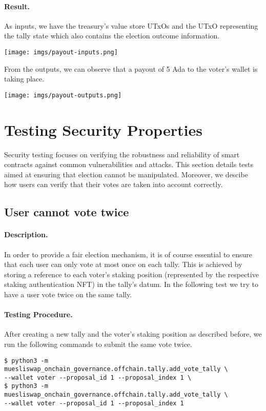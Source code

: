 \documentclass[11pt]{article}
\begin{document}
\paragraph{Result.} As inputs, we have the treasury's value store UTxOs and the UTxO representing the tally state which also contains the election outcome information.
\bigskip

\texttt{[image: imgs/payout-inputs.png]}

\bigskip
From the outputs, we can observe that a payout of 5 Ada to the voter's wallet is taking place.
\bigskip

\texttt{[image: imgs/payout-outputs.png]}


\section{Testing Security Properties}

Security testing focuses on verifying the robustness and reliability of smart contracts against common vulnerabilities and attacks. This section details tests aimed at ensuring that election cannot be manipulated. Moreover, we descibe how users can verify that their votes are taken into account correctly.

\subsection{User cannot vote twice}
\paragraph{Description.} In order to provide a fair election mechanism, it is of course essential to ensure that each user can only vote at most once on each tally. This is achieved by storing a reference to each voter's staking position (represented by the respective staking authentication NFT) in the tally's datum. In the following test we try to have a user vote twice on the same tally.

\paragraph{Testing Procedure.} After creating a new tally and the voter's staking position as described before, we run the following commands to submit the same vote twice.
\begin{verbatim}
$ python3 -m muesliswap_onchain_governance.offchain.tally.add_vote_tally \
--wallet voter --proposal_id 1 --proposal_index 1 \
$ python3 -m muesliswap_onchain_governance.offchain.tally.add_vote_tally \
--wallet voter --proposal_id 1 --proposal_index 1
\end{verbatim}
\end{document}

